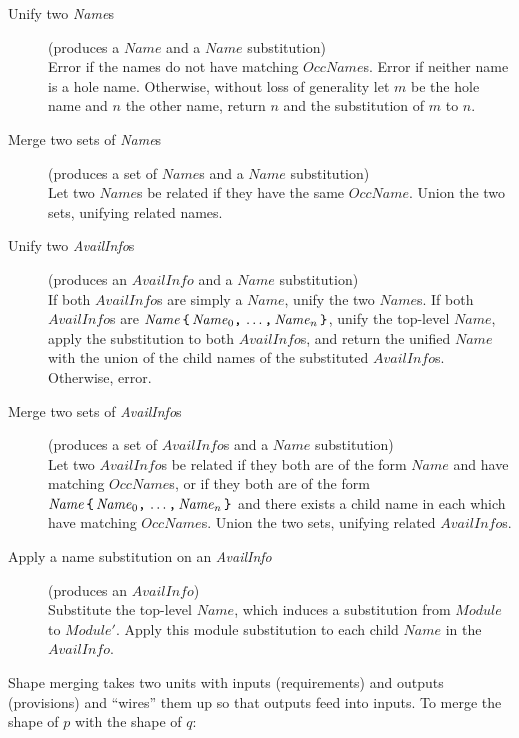 \documentclass{article}
\newcommand{\I}[1]{\ensuremath{\mathit{#1}}}
\begin{document}
\begin{description}
    \item[Unify two \textit{Name}s]
    (produces a \I{Name} and a \I{Name} substitution) \\
    Error if the names do not have matching \I{OccName}s.  Error if neither name
    is a hole name.  Otherwise, without loss of generality let $m$ be the hole name
    and $n$ the other name, return $n$ and the substitution of $m$ to $n$.
    \item[Merge two sets of \textit{Name}s]
    (produces a set of \I{Name}s and a \I{Name} substitution) \\
    Let two \I{Name}s be related if they have the same \I{OccName}.
    Union the two sets, unifying related names.
    \item[Unify two \textit{AvailInfo}s]
    (produces an \I{AvailInfo} and a \I{Name} substitution) \\
    If both \I{AvailInfo}s are simply
    a \I{Name}, unify the two \I{Name}s.  If both \I{AvailInfo}s are
    $\I{Name}\, \verb|{|\, \I{Name}_0\verb|,|\, \ldots\verb|,|\, \I{Name}_n\, \verb|}|$,
    unify the top-level \I{Name}, apply the substitution to both \I{AvailInfo}s,
    and return the unified \I{Name} with the union of the child names of the
    substituted \I{AvailInfo}s.
    Otherwise, error.
    \item[Merge two sets of \textit{AvailInfo}s]
    (produces a set of \I{AvailInfo}s and a \I{Name} substitution) \\
    Let two \I{AvailInfo}s be related if they both are of the form
    \I{Name} and have matching \I{OccName}s, or if they both are of
    the form
    $\I{Name}\, \verb|{|\, \I{Name}_0\verb|,|\, \ldots\verb|,|\, \I{Name}_n\, \verb|}|$
    and there exists a child name in each which have matching \I{OccName}s.
    Union the two sets, unifying related \I{AvailInfo}s.
    \item[Apply a name substitution on an \textit{AvailInfo}] (produces an \I{AvailInfo}) \\
    Substitute the top-level \I{Name}, which induces a substitution from
    \I{Module} to $\I{Module}'$.  Apply this module substitution to each child
    \I{Name} in the \I{AvailInfo}.

\end{description}
%
Shape merging takes two units with inputs (requirements) and outputs
(provisions) and ``wires'' them up so that outputs feed into inputs. To
merge the shape of $p$ with the shape of $q$:
\end{document}
